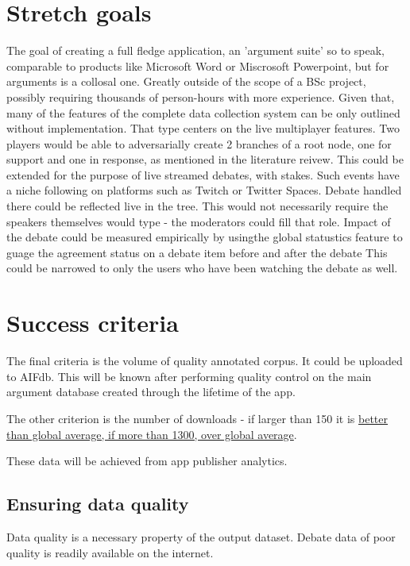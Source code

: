 \documentclass{article}
\begin{document}
\section{Stretch goals}
The goal of creating a full fledge application, an 'argument suite' so to speak, comparable to products like Microsoft Word or Miscrosoft Powerpoint, but for arguments is a collosal one.
Greatly outside of the scope of a BSc project, possibly requiring thousands of person-hours with more experience.
Given that, many of the features of the complete data collection system can be only outlined without implementation.
That type centers on the live multiplayer features. Two players would be able to adversarially create 2 branches of a root node, one for support and one in response, as mentioned in the literature reivew. 
This could be extended for the purpose of live streamed debates, with stakes. Such events have a niche following on platforms such as Twitch or Twitter Spaces.
Debate handled there could be reflected live in the tree. This would not necessarily require the speakers themselves would type - the moderators could fill that role.
Impact of the debate could be measured empirically by usingthe global statustics feature to guage the agreement status on a debate item before and after the debate
This could be narrowed to only the users who have been watching the debate as well.


\section{Success criteria}
The final criteria is the volume of quality annotated corpus. It could be uploaded to AIFdb. 
This will be known after performing quality control on the main argument database created through the lifetime of the app. 

The other criterion is the number of downloads - if larger than 150 it is \href{https://www.statista.com/statistics/1119893/average-number-downloads-united-states-app-publishers/}{ better than global average, if more than 1300, over global average}.


These data will be achieved from app publisher analytics.

\subsection{Ensuring data quality}
Data quality is a necessary property of the output dataset. Debate data of poor quality is readily available on the internet.
\end{document}
